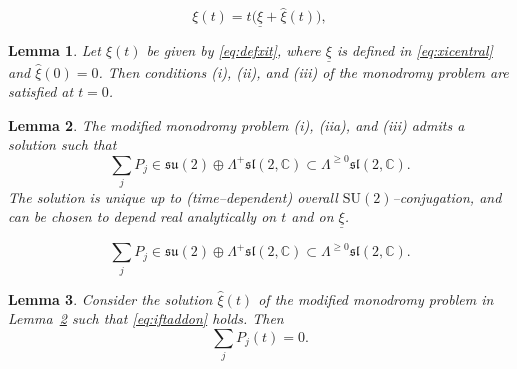 \documentclass[10pt,a4paper]{amsart}
\newtheorem{lemma}{Lemma}
\newcommand{\C}{\mathbb C}
\begin{document}
\begin{equation}\label{eq:defxit}
\xi(t)
=
t\bigl(\underline\xi+\hat\xi(t)\bigr),
\end{equation}

\begin{lemma}\label{lem:IFTt0}
Let $\xi(t)$ be given by \eqref{eq:defxit}, where $\underline\xi$ is defined in
\eqref{eq:xicentral} and $\hat\xi(0)=0$.
Then conditions \emph{(i)}, \emph{(ii)}, and \emph{(iii)} of the monodromy problem
are satisfied at $t=0$.
\end{lemma}

\begin{lemma}\label{lem:modified-monodromy}
The modified monodromy problem \emph{(i)}, \emph{(iia)}, and \emph{(iii)} admits a solution such that
\begin{equation}\label{eq:iftaddon}
\sum_j P_j
\in
\mathfrak{su}(2)\oplus \Lambda^{+}\mathfrak{sl}(2,\C)
\subset
\Lambda^{\geq0}\mathfrak{sl}(2,\C).
\end{equation}
The solution is unique up to (time--dependent) overall $\mathrm{SU}(2)$--conjugation, and can be chosen
to depend real analytically on $t$ and on $\underline\xi$.
\end{lemma}

\begin{equation}
\sum_j P_j
\in
\mathfrak{su}(2)\oplus \Lambda^{+}\mathfrak{sl}(2,\C)
\subset
\Lambda^{\geq0}\mathfrak{sl}(2,\C).
\end{equation}

\begin{lemma}\label{lem:sum-P-zero}
Consider the solution $\hat\xi(t)$ of the modified monodromy problem
in Lemma~\ref{lem:modified-monodromy} such that \eqref{eq:iftaddon} holds.
Then
\[
\sum_j P_j(t)=0.
\]
\end{lemma}
\end{document}
